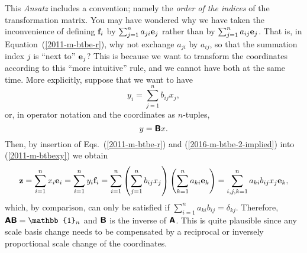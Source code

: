 This {\it Ansatz} includes a convention; namely the {\em order of the indices} of the transformation matrix.
You may have wondered why we have taken the inconvenience of defining
${\bf f}_i$ by $\sum_{j=1}^n a_{ji} {\bf e}_j$ rather than by $\sum_{j=1}^n a_{ij} {\bf e}_j$.
That is, in  Equation~(\ref{2011-m-btbe-r}), why not exchange $a_{ji}$ by $a_{ij}$,
so that the summation index $j$ is ``next to'' ${\bf e}_j$?
This is because we want to transform the coordinates according to this ``more intuitive'' rule, and we cannot have both
at the same time.
More explicitly, suppose that we want to have
\begin{equation}
y_i =\sum_{j=1}^n b_{ij} x_j
,
\label{2016-m-btbe-2-implied}
\end{equation}
or, in operator notation and the coordinates as $n$-tuples,
\begin{equation}
y = \textsf{\textbf{B}} x
.
\label{2016-m-btbe-2-impliedm}
\end{equation}
Then, by insertion of  Eqs.~(\ref{2011-m-btbe-r}) and (\ref{2016-m-btbe-2-implied}) into (\ref{2011-m-btbexy})
we obtain
\begin{equation}
{\bf z}=
\sum_{i=1}^n x_i{\bf e}_i
=
\sum_{i=1}^n  y_i{\bf f}_i
= \sum_{i=1}^n \left( \sum_{j=1}^n b_{ij} x_j \right)   \left( \sum_{k=1}^n a_{ki} {\bf e}_k \right)
= \sum_{i,j,k=1}^n  a_{ki} b_{ij}  x_j {\bf e}_k
,
\label{2016-m-btbexy}
\end{equation}
which, by comparison, can only be satisfied if  $\sum_{i=1}^n  a_{ki} b_{ij} = \delta_{kj}$.
Therefore, $\textsf{\textbf{A}}\textsf{\textbf{B}} = \mathbb{1}_n$ and
$\textsf{\textbf{B}}$   is the inverse of
$\textsf{\textbf{A}}$.
This is quite plausible since any scale basis change needs to be compensated by a reciprocal or inversely proportional
scale change of the coordinates.




